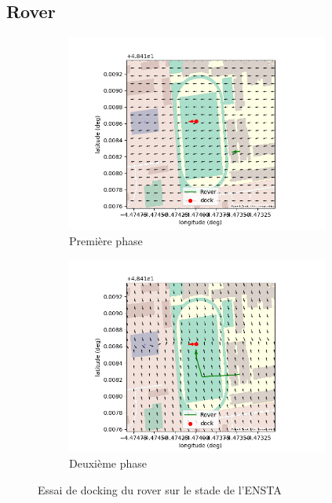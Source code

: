 \documentclass[12pt]{report}
\begin{document}
\subsection{Rover}

\begin{figure}[H]
  \centering
  \begin{subfigure}{0.45\textwidth}
    \centering
    \includegraphics[width=0.95\textwidth]{imgs/visu_2.png}
    \caption{Première phase}
  \end{subfigure}
  \begin{subfigure}{0.45\textwidth}
    \centering
    \includegraphics[width=0.95\textwidth]{imgs/visu_1.png}
    \caption{Deuxième phase}

  \end{subfigure}
  \caption{Essai de docking du rover sur le stade de l'ENSTA}
\end{figure}
\end{document}
